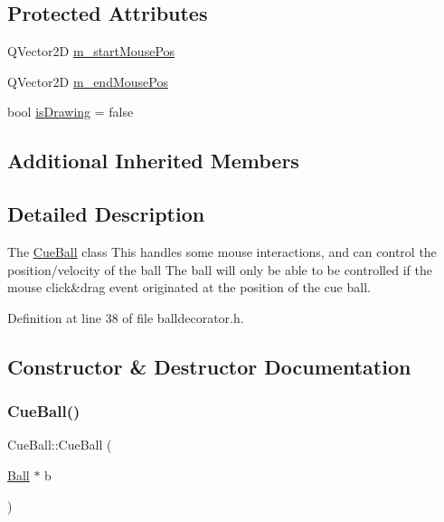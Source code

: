 \subsection*{Protected Attributes}
\begin{DoxyCompactItemize}
\item 
Q\+Vector2D \mbox{\hyperlink{class_cue_ball_a31c90da6dfe1fcaba9dae9a9860028b9}{m\+\_\+start\+Mouse\+Pos}}
\item 
Q\+Vector2D \mbox{\hyperlink{class_cue_ball_a2266dea32739c919dbd7848167536a4e}{m\+\_\+end\+Mouse\+Pos}}
\item 
bool \mbox{\hyperlink{class_cue_ball_a83f8528e08491dc39f22888ddd3bfdff}{is\+Drawing}} = false
\end{DoxyCompactItemize}
\subsection*{Additional Inherited Members}


\subsection{Detailed Description}
The \mbox{\hyperlink{class_cue_ball}{Cue\+Ball}} class This handles some mouse interactions, and can control the position/velocity of the ball The ball will only be able to be controlled if the mouse click\&drag event originated at the position of the cue ball. 

Definition at line 38 of file balldecorator.\+h.



\subsection{Constructor \& Destructor Documentation}
\mbox{\label{class_cue_ball_a9a5dd540283fcd724b7f1a3bce11fbf0}} 
\subsubsection{\texorpdfstring{Cue\+Ball()}{CueBall()}}
{\footnotesize\ttfamily Cue\+Ball\+::\+Cue\+Ball (\begin{DoxyParamCaption}\item[{\mbox{\hyperlink{class_ball}{Ball}} $\ast$}]{b }\end{DoxyParamCaption})\hspace{0.3cm}{\ttfamily [inline]}}



